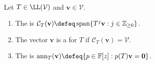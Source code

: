 \begin{definition} \label{def:cyclic-subspace-and-vector-annihilator} \\
Let $T\in\LL(\mathcal{V})$ and $\mathbf{v}\in\mathcal{V}$.
\begin{enumerate}[label=(\roman*)]
\setlength{\itemsep}{0pt}
\item The  is $\mathcal{C}_T(\mathbf{v})\defeq\operatorname{span}\{T^j\mathbf{v}:j\in\mathbb{Z}_{\geq0}\}$.
\item The vector $\mathbf{v}$ is a  for $T$ if $\mathcal{C}_T(\mathbf{v})=\mathcal{V}$.
\item The  is $\operatorname{ann}_T(\mathbf{v})\defeq\{p\in\mathbb{F}[z]:p(T)\mathbf{v}=\mathbf{0}\}$.
\end{enumerate}
\end{definition}

